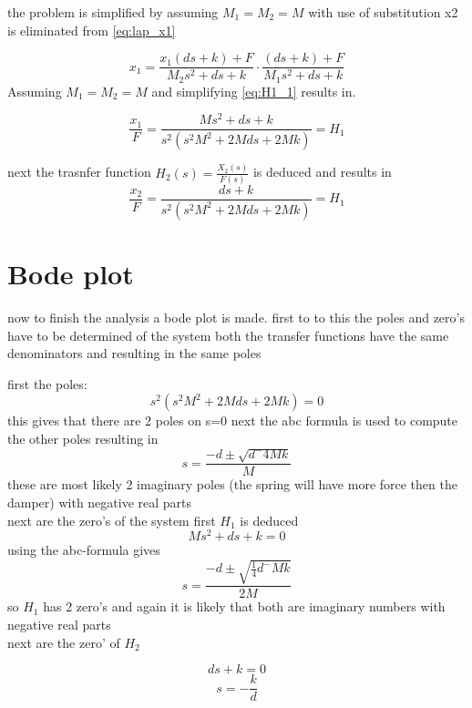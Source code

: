 \documentclass[report.tex]{subfiles}
\begin{document}
the problem is simplified by assuming $M_1=M_2=M$ with use of substitution x2 is eliminated from \eqref{eq:lap_x1}

\begin{equation}
\label{eq:H1_1}
x_1=\frac{x_1(ds+k)+F}{M_2s^2+ds+k}\cdot\frac{(ds+k)+F}{M_1s^2+ds+k}
\end{equation}
Assuming $M_1=M_2=M$ and simplifying \eqref{eq:H1_1} results in.

\begin{equation}
\label{eq:H1_2}
\frac{x_1}{F}=\frac{Ms^2+ds+k}{s^2(s^2M^2+2Mds+2Mk)}=H_1
\end{equation}

next the trasnfer function ${ H }_{ 2 }(s)=\frac { { X }_{ 2 }(s) }{ F(s) } $ is deduced and results in
\begin{equation}
\label{eq:H2}
\frac{x_2}{F}=\frac{ds+k}{s^2(s^2M^2+2Mds+2Mk)}=H_1
\end{equation}
\section{Bode plot}
now to finish the analysis a bode plot is made.
first to to this the poles and zero's have to be determined of the system
both the transfer functions have the same denominators and resulting in the same poles

first the poles:
\begin{equation}
s^2(s^2M^2+2Mds+2Mk)=0
\end{equation}
this gives that there are 2 poles on s=0
next the abc formula is used to compute the other poles resulting in
\begin{equation}
s=\frac{-d\pm\sqrt{d^-4Mk}}{M}
\end{equation}
these are most likely 2 imaginary poles (the spring will have more force then the damper) with negative real parts\\
next are the zero's of the system first $H_1$ is deduced
\begin{equation}
Ms^2+ds+k=0
\end{equation}
using the abc-formula gives
\begin{equation}
s=\frac{-d\pm\sqrt{\frac{1}{4}d^-Mk}}{2M}
\end{equation}
so $H_1$ has 2 zero's and again it is likely that both are imaginary numbers with negative real parts\\
next are the zero' of $H_2$

\begin{equation}
ds+k=0
\end{equation}
\begin{equation}
s=-\frac{k}{d}
\end{equation}
\end{document}
